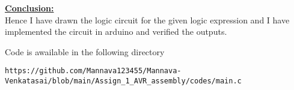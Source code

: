 \documentclass[10pt,a4paper,twocolumn]{report}
\begin{document}
\vspace{5mm}
\raggedright \textbf{\underline{Conclusion:}}\vspace{7mm}
\\ Hence I have drawn the logic circuit for the given logic expression and I have implemented the circuit in arduino and verified the outputs.
\vspace{10mm}
\\ \raggedright Code is awailable in the following directory \\
\begin{lstlisting}
https://github.com/Mannava123455/Mannava-Venkatasai/blob/main/Assign_1_AVR_assembly/codes/main.c
\end{lstlisting}
\end{document}
